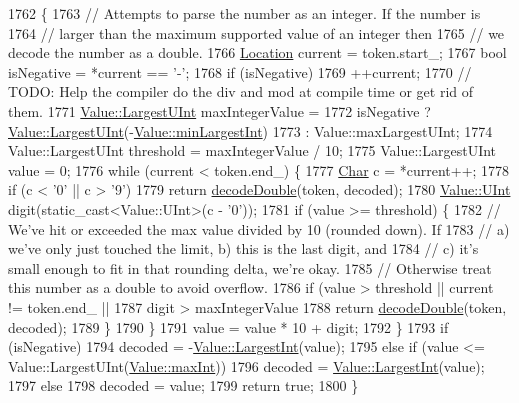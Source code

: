 \begin{DoxyCode}
1762                                                          \{
1763   \textcolor{comment}{// Attempts to parse the number as an integer. If the number is}
1764   \textcolor{comment}{// larger than the maximum supported value of an integer then}
1765   \textcolor{comment}{// we decode the number as a double.}
1766   \hyperlink{class_json_1_1_our_reader_a1bdc7bbc52ba87cae6b19746f2ee0189}{Location} current = token.start\_;
1767   \textcolor{keywordtype}{bool} isNegative = *current == \textcolor{charliteral}{'-'};
1768   \textcolor{keywordflow}{if} (isNegative)
1769     ++current;
1770   \textcolor{comment}{// TODO: Help the compiler do the div and mod at compile time or get rid of them.}
1771   \hyperlink{class_json_1_1_value_a6682a3684d635e03fc06ba229fa24eec}{Value::LargestUInt} maxIntegerValue =
1772       isNegative ? \hyperlink{class_json_1_1_value_a6682a3684d635e03fc06ba229fa24eec}{Value::LargestUInt}(-\hyperlink{class_json_1_1_value_af91df130daa50dd43d2cd89e6ee67706}{Value::minLargestInt})
1773                  : Value::maxLargestUInt;
1774   Value::LargestUInt threshold = maxIntegerValue / 10;
1775   Value::LargestUInt value = 0;
1776   \textcolor{keywordflow}{while} (current < token.end\_) \{
1777     \hyperlink{class_json_1_1_our_reader_a0cd0bab4caa66594ab843ccd5f9dc239}{Char} c = *current++;
1778     \textcolor{keywordflow}{if} (c < '0' || c > \textcolor{charliteral}{'9'})
1779       \textcolor{keywordflow}{return} \hyperlink{class_json_1_1_our_reader_a1d1c3b44f6720a0e7c39b5ae8de3981c}{decodeDouble}(token, decoded);
1780     \hyperlink{class_json_1_1_value_a0933d59b45793ae4aade1757c322a98d}{Value::UInt} digit(static\_cast<Value::UInt>(c - \textcolor{charliteral}{'0'}));
1781     \textcolor{keywordflow}{if} (value >= threshold) \{
1782       \textcolor{comment}{// We've hit or exceeded the max value divided by 10 (rounded down). If}
1783       \textcolor{comment}{// a) we've only just touched the limit, b) this is the last digit, and}
1784       \textcolor{comment}{// c) it's small enough to fit in that rounding delta, we're okay.}
1785       \textcolor{comment}{// Otherwise treat this number as a double to avoid overflow.}
1786       \textcolor{keywordflow}{if} (value > threshold || current != token.end\_ ||
1787           digit > maxIntegerValue %
1788         \textcolor{keywordflow}{return} \hyperlink{class_json_1_1_our_reader_a1d1c3b44f6720a0e7c39b5ae8de3981c}{decodeDouble}(token, decoded);
1789       \}
1790     \}
1791     value = value * 10 + digit;
1792   \}
1793   \textcolor{keywordflow}{if} (isNegative)
1794     decoded = -\hyperlink{class_json_1_1_value_a1cbb82642ed05109b9833e49f042ece7}{Value::LargestInt}(value);
1795   \textcolor{keywordflow}{else} \textcolor{keywordflow}{if} (value <= Value::LargestUInt(\hyperlink{class_json_1_1_value_a978c799a8af3114ef7dab6fd0a310a1b}{Value::maxInt}))
1796     decoded = \hyperlink{class_json_1_1_value_a1cbb82642ed05109b9833e49f042ece7}{Value::LargestInt}(value);
1797   \textcolor{keywordflow}{else}
1798     decoded = value;
1799   \textcolor{keywordflow}{return} \textcolor{keyword}{true};
1800 \}
\end{DoxyCode}
